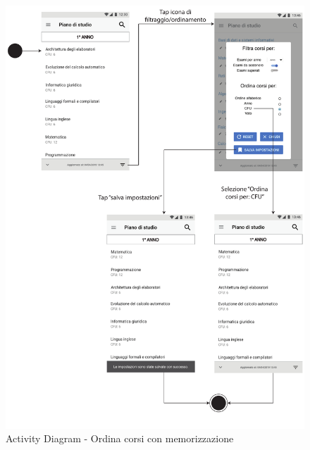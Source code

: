 \begin{figure}
	\centering
	\includegraphics[width=6in]{imgs/gruppo1/activity_diagrams/AD4_ordina_corsi.pdf}
	\caption{Activity Diagram - Ordina corsi con memorizzazione}
	\label{diag:ordinaCorsiConMemAD}
\end{figure}

\clearpage